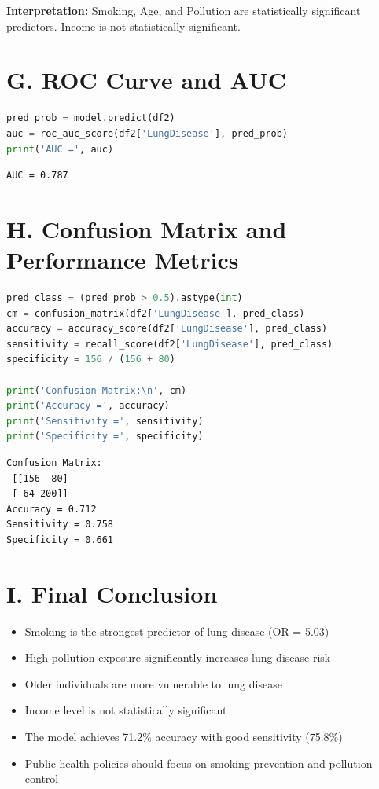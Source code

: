 \documentclass[12pt, a4paper]{article}
\begin{document}
\textbf{\textcolor{RoyalNavy}{Interpretation:}} Smoking, Age, and Pollution are statistically significant predictors. Income is not statistically significant.

\section*{G. ROC Curve and AUC}

\begin{lstlisting}[language=Python]
pred_prob = model.predict(df2)
auc = roc_auc_score(df2['LungDisease'], pred_prob)
print('AUC =', auc)
\end{lstlisting}

\begin{outputbox}
\begin{verbatim}
AUC = 0.787
\end{verbatim}
\end{outputbox}

\section*{H. Confusion Matrix and Performance Metrics}

\begin{lstlisting}[language=Python]
pred_class = (pred_prob > 0.5).astype(int)
cm = confusion_matrix(df2['LungDisease'], pred_class)
accuracy = accuracy_score(df2['LungDisease'], pred_class)
sensitivity = recall_score(df2['LungDisease'], pred_class)
specificity = 156 / (156 + 80)

print('Confusion Matrix:\n', cm)
print('Accuracy =', accuracy)
print('Sensitivity =', sensitivity)
print('Specificity =', specificity)
\end{lstlisting}

\begin{outputbox}
\begin{verbatim}
Confusion Matrix:
 [[156  80]
 [ 64 200]]
Accuracy = 0.712
Sensitivity = 0.758
Specificity = 0.661
\end{verbatim}
\end{outputbox}

\section*{I. Final Conclusion}

\begin{itemize}
    \item Smoking is the strongest predictor of lung disease (OR = 5.03)
    \item High pollution exposure significantly increases lung disease risk
    \item Older individuals are more vulnerable to lung disease
    \item Income level is not statistically significant
    \item The model achieves 71.2\% accuracy with good sensitivity (75.8\%)
    \item Public health policies should focus on smoking prevention and pollution control
\end{itemize}
\end{document}
